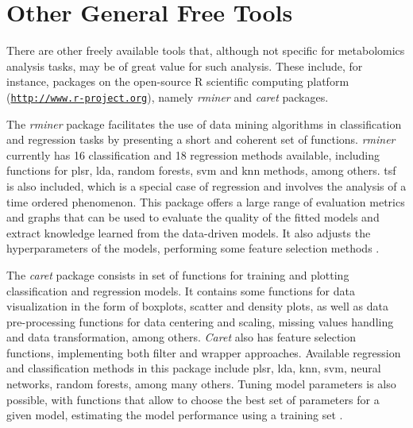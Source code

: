 \section{Other General Free Tools}

There are other freely available tools that, although not specific for metabolomics analysis tasks, may be of great value for such analysis. These include, for instance, packages on the open-source R scientific computing platform (\href{http://www.r-project.org}{\nolinkurl{http://www.r-project.org}}), namely \textit{rminer} and \textit{caret} packages.

The \textit{rminer} package facilitates the use of data mining algorithms in classification and regression tasks by presenting a short and coherent set of functions. \textit{rminer} currently has 16 classification and 18 regression methods available, including functions for \gls{plsr}, \gls{lda}, random forests, \gls{svm} and \gls{knn} methods, among others. \gls{tsf} is also included, which is a special case of regression and involves the analysis of a time ordered phenomenon. This package offers a large range of evaluation metrics and graphs that can be used to evaluate the quality of the fitted models and extract knowledge learned from the data-driven models. It also adjusts the hyperparameters of the models, performing some feature selection methods \citep{rminer}. 

The \textit{caret} package consists in set of functions for training and plotting classification and regression models. It contains some functions for data visualization in the form of boxplots, scatter and density plots, as well as data pre-processing functions for data centering and scaling, missing values handling and data transformation, among others. \textit{Caret} also has feature selection functions, implementing both filter and wrapper approaches. Available regression and classification methods in this package include \gls{plsr}, \gls{lda}, \gls{knn}, \gls{svm}, neural networks, random forests, among many others. Tuning model parameters is also possible, with functions that allow to choose the best set of parameters for a given model, estimating the model performance using a training set \citep{caret}.






